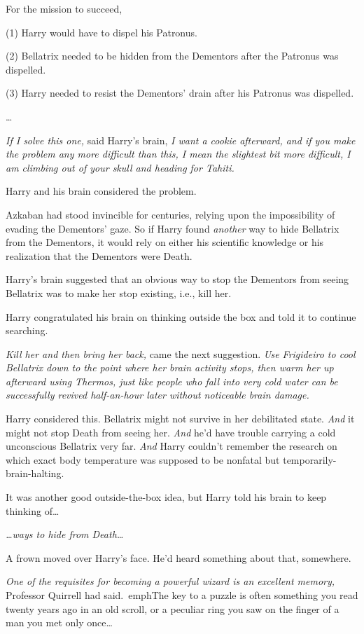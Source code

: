For the mission to succeed,

(1) Harry would have to dispel his Patronus.

(2) Bellatrix needed to be hidden from the Dementors after the Patronus was 
dispelled.

(3) Harry needed to resist the Dementors' drain after his Patronus was 
dispelled.

{\ldots}

\emph{If I solve this one,} said Harry's brain, \emph{I want a cookie 
afterward, and if you make the problem any more difficult than this, I mean the 
slightest bit more difficult, I am climbing out of your skull and heading for 
Tahiti.}

Harry and his brain considered the problem.

Azkaban had stood invincible for centuries, relying upon the impossibility of 
evading the Dementors' gaze. So if Harry found \emph{another} way to hide 
Bellatrix from the Dementors, it would rely on either his scientific knowledge 
or his realization that the Dementors were Death.

Harry's brain suggested that an obvious way to stop the Dementors from seeing 
Bellatrix was to make her stop existing, i.e., kill her.

Harry congratulated his brain on thinking outside the box and told it to 
continue searching.

\emph{Kill her and then bring her back,} came the next suggestion. \emph{Use 
Frigideiro to cool Bellatrix down to the point where her brain activity stops, 
then warm her up afterward using Thermos, just like people who fall into very 
cold water can be successfully revived half-an-hour later without noticeable 
brain damage.}

Harry considered this. Bellatrix might not survive in her debilitated state. 
\emph{And} it might not stop Death from seeing her. \emph{And} he'd have 
trouble carrying a cold unconscious Bellatrix very far. \emph{And} Harry 
couldn't remember the research on which exact body temperature was supposed to 
be nonfatal but temporarily-brain-halting.

It was another good outside-the-box idea, but Harry told his brain to keep 
thinking of{\ldots}

\emph{{\ldots}ways to hide from Death{\ldots}}

A frown moved over Harry's face. He'd heard something about that, somewhere.

\emph{One of the requisites for becoming a powerful wizard is an excellent 
memory,} Professor Quirrell had said.\ emph{The key to a puzzle is often 
something you read twenty years ago in an old scroll, or a peculiar ring you 
saw on the finger of a man you met only once{\ldots}}

